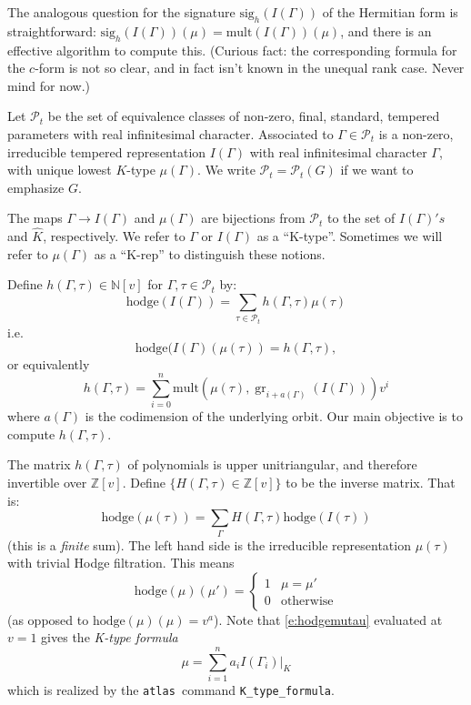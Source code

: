 \documentclass[12pt,leqno]{article}
\newcommand{\sig}{\text{sig}}
\newcommand{\hodge}{\text{hodge}}
\DeclareMathOperator{\gr}{\text{gr}}
\newcommand{\mult}{\text{mult}}
\newcommand\Pt{\mathcal P_t}
\newcommand{\krep}{K-rep}
\newcommand{\Z}{\mathbb Z}
\newcommand{\N}{\mathbb N}
\newcommand{\Khat}{\widehat K}
\newcommand{\atlas}{{\tt atlas~}}
\begin{document}
The analogous question for the signature $\sig_h(I(\Gamma))$ of the
Hermitian form is straightforward: $\sig_h(I(\Gamma))(\mu)=\mult(I(\Gamma))(\mu)$, and
there is an effective algorithm to compute this.  (Curious fact: the
corresponding formula for the $c$-form is not so clear, and in fact
isn't known in the unequal rank case. Never mind for now.)

\medskip

Let $\Pt$ be the set of equivalence classes of non-zero, final,
standard, tempered parameters with real infinitesimal
character. Associated to $\Gamma\in\Pt$ is a non-zero, irreducible
tempered representation $I(\Gamma)$ with real infinitesimal character
$\Gamma$, with unique lowest $K$-type $\mu(\Gamma)$.
We write $\Pt=\Pt(G)$ if we want to emphasize $G$.

The maps
$\Gamma\rightarrow I(\Gamma)$ and $\mu(\Gamma)$ are bijections from
$\Pt$ to the set of $I(\Gamma)'s$ and $\Khat$, respectively.  We refer to $\Gamma$ or
$I(\Gamma)$ as a ``K-type''. Sometimes we will refer to
$\mu(\Gamma)$ as a
``\krep'' to distinguish these notions.

Define  $h(\Gamma,\tau)\in\N[v]$ for $\Gamma,\tau\in \Pt$ by:
\begin{equation}
\label{e:hgammatau}
\hodge(I(\Gamma))=\sum_{\tau\in\Pt}h(\Gamma,\tau)\mu(\tau)
\end{equation}
i.e.
$$
\hodge(I(\Gamma)(\mu(\tau))=h(\Gamma,\tau),
$$
or equivalently
$$
h(\Gamma,\tau)=\sum_{i=0}^n\mult(\mu(\tau), \gr_{i+a(\Gamma)}(I(\Gamma)))v^i
$$
where $a(\Gamma)$ is the codimension of the underlying orbit.
Our main objective is to compute $h(\Gamma,\tau)$.

The matrix $h(\Gamma,\tau)$ of polynomials is upper unitriangular, and therefore invertible over $\Z[v]$.
Define $\{H(\Gamma,\tau)\in\Z[v]\}$ to be the inverse matrix. That is:
\begin{equation}
\label{e:hodgemutau}
\hodge(\mu(\tau))=\sum_{\Gamma} H(\Gamma,\tau)\hodge(I(\tau))
\end{equation}
(this is a {\it finite} sum). The left hand side is the irreducible representation $\mu(\tau)$ with
trivial Hodge filtration. This means
$$
\hodge(\mu)(\mu')=
\begin{cases}
1&\mu=\mu'\\
0&\text{otherwise}
\end{cases}
$$
(as opposed to $\hodge(\mu)(\mu)=v^a$).
Note that \eqref{e:hodgemutau} evaluated at $v=1$ gives the {\it K-type formula}
$$
\mu=\sum_{i=1}^n a_i I(\Gamma_i)|_K
$$
which is realized by the \atlas command {\tt K\_type\_formula}.
\end{document}
